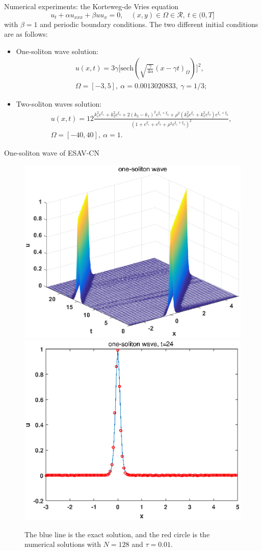 \documentclass[10pt]{beamer}
\begin{document}
\begin{frame}{Numerical experiments: the Korteweg-de Vries equation}
\begin{equation*}
u_t+\alpha u_{xxx}+\beta uu_x=0,\quad (x,y)\in\Omega\in\mathcal{R},\ t\in (0,T]
\end{equation*} 
with $\beta=1$ and periodic boundary conditions. The two different initial conditions are as follows:
\begin{itemize}
\item One-soliton wave solution: 
\begin{equation*}
\begin{aligned}
&u(x,t)= 3\gamma\bigg[\mbox{sech}\left(\sqrt{\frac{\gamma}{4\alpha}}(x-\gamma t)_\Omega\right)\bigg]^2, \\ &\Omega=[-3,5],\ \alpha=0.0013020833,\ \gamma=1/3;
\end{aligned}
\end{equation*}
\item Two-soliton waves solution: 
\begin{equation*}
\begin{aligned}
&u(x,t)=12\frac{k_1^2e^{\xi_1}+k_2^2e^{\xi_2}+2(k_2-k_1)^2e^{\xi_1+\xi_2}+\rho^2(k_2^2e^{\xi_1}+k_1^2e^{\xi_2})e^{\xi_1+\xi_2}}{\left(1+e^{\xi_1}+e^{\xi_2}+\rho^2e^{\xi_1+\xi_2}\right)^2},\\
&\Omega=[-40,40],\ \alpha=1.
\end{aligned}
\end{equation*}
\end{itemize}
\end{frame}

\begin{frame}{One-soliton wave of ESAV-CN}
\begin{figure}[H]
\centering
\includegraphics[width=0.45\linewidth]{KDV_OS_ESAV_CN}\hspace{-2mm}
\includegraphics[width=0.45\linewidth]{KDV_OS_ESAV_CN_time}
\caption{The blue line is the exact solution, and the red circle is the numerical solutions with $N=128$ and $\tau=0.01$.}
\end{figure}
\end{frame}
\end{document}
